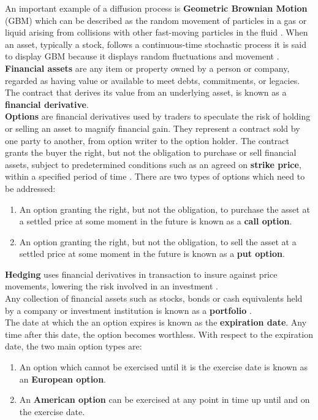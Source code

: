 \documentclass[12pt]{article}
\begin{document}
An important example of a diffusion process is \textbf{Geometric Brownian Motion} (GBM) which can be described as the random movement of particles in a gas or liquid arising from collisions with other fast-moving particles in the fluid \citep{Ermogenous} \citep{Pollen}. When an asset, typically a stock, follows a continuous-time stochastic process it is said to display GBM because it displays random fluctuations and movement \citep{Klebaner}.
\\

\textbf{Financial assets} are any item or property owned by a person or company, regarded as having value or available to meet debts, commitments, or legacies. The contract that derives its value from an underlying asset, is known as a \textbf{financial derivative}. 
\\
 
\textbf{Options} are financial derivatives used by traders to speculate the risk of holding or selling an asset to magnify financial gain. They represent a contract sold by one party to another, from option writer to the option holder. The contract grants the buyer the right, but not the obligation to purchase or sell financial assets, subject to predetermined conditions such as an agreed on \textbf{strike price}, within a specified period of time \citep{Maths}. There are two types of options which need to be addressed:
\begin{enumerate}
	\item An option granting the right, but not the obligation, to purchase the asset at a settled price at some moment in the future is known as a \textbf{call option}.
	\item An option granting the right, but not the obligation, to sell the asset at a settled price at some moment in the future is known as a \textbf{put option}.
\end{enumerate}

\textbf{Hedging} uses financial derivatives in transaction to insure against price movements, lowering the risk involved in an investment \citep{Maths}.
\\

Any collection of financial assets such as stocks, bonds or cash equivalents held by a company or investment institution is known as a \textbf{portfolio} \citep{Maths}.
\\

The date at which the an option expires is known as the \textbf{expiration date}. Any time after this date, the option becomes worthless. With respect to the expiration date, the two main option types are:
\begin{enumerate}
	\item An option which cannot be exercised until it is the exercise date is known as an \textbf{European option}.
	\item An \textbf{American option} can be exercised at any point in time up until and on the exercise date.
\end{enumerate}
\end{document}
